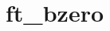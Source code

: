 \chapter{ft\+\_\+bzero}
\hypertarget{md_Documentation_2ft__bzero}{}\label{md_Documentation_2ft__bzero}
